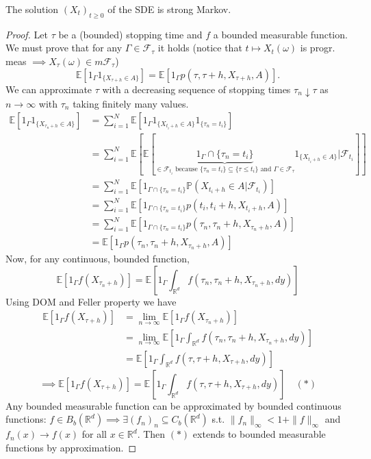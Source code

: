\begin{proposition}
    The solution $(X_t)_{t \ge 0}$ of the SDE is strong Markov.
\end{proposition}

\begin{proof}
    Let $\tau$ be a (bounded) stopping time and $f$ a bounded measurable function. We must prove that for any $\Gamma \in \mathcal{F}_\tau$ it holds (notice that $t \mapsto X_t(\omega)$ is progr. meas $\implies X_\tau(\omega) \in m\mathcal{F}_\tau$)
    $$\mathbb{E}[1_\Gamma 1_{\{X_{\tau+h} \in A\}}] = \mathbb{E}[1_\Gamma p(\tau, \tau+h, X_{\tau+h}, A)].$$
    We can approximate $\tau$ with a decreasing sequence of stopping times $\tau_n \downarrow \tau$ as $n \to \infty$ with $\tau_n$ taking finitely many values.
    \begin{align*}
        \mathbb{E}[1_\Gamma 1_{\{X_{\tau_n+h} \in A\}}] &= \sum_{i=1}^N \mathbb{E}[1_\Gamma 1_{\{X_{t_i+h} \in A\}} 1_{\{\tau_n = t_i\}}] \\
        &= \sum_{i=1}^N \mathbb{E}[\mathbb{E}[\underbrace{1_\Gamma \cap \{\tau_n = t_i\}}_{\in \mathcal{F}_{t_i} \text{ because } \{\tau_n=t_i\} \subseteq \{\tau \le t_i\} \text{ and } \Gamma \in \mathcal{F}_\tau} 1_{\{X_{t_i+h} \in A\}} | \mathcal{F}_{t_i}]] \\
        &= \sum_{i=1}^N \mathbb{E}[1_{\Gamma \cap \{\tau_n = t_i\}} \mathbb{P}(X_{t_i+h} \in A | \mathcal{F}_{t_i})] \\
        &= \sum_{i=1}^N \mathbb{E}[1_{\Gamma \cap \{\tau_n = t_i\}} p(t_i, t_i+h, X_{t_i+h}, A)] \\
        &= \sum_{i=1}^N \mathbb{E}[1_{\Gamma \cap \{\tau_n = t_i\}} p(\tau_n, \tau_n+h, X_{\tau_n+h}, A)] \\
        &= \mathbb{E}[1_\Gamma p(\tau_n, \tau_n+h, X_{\tau_n+h}, A)]
    \end{align*}
    Now, for any continuous, bounded function,
    $$\mathbb{E}[1_\Gamma f(X_{\tau_n+h})] = \mathbb{E}[1_\Gamma \int_{\mathbb{R}^d} f(\tau_n, \tau_n+h, X_{\tau_n+h}, dy)]$$
    Using DOM and Feller property we have
    \begin{align*}
        \mathbb{E}[1_\Gamma f(X_{\tau+h})] &= \lim_{n \to \infty} \mathbb{E}[1_\Gamma f(X_{\tau_n+h})] \\
        &= \lim_{n \to \infty} \mathbb{E}[1_\Gamma \int_{\mathbb{R}^d} f(\tau_n, \tau_n+h, X_{\tau_n+h}, dy)] \\
        &= \mathbb{E}[1_\Gamma \int_{\mathbb{R}^d} f(\tau, \tau+h, X_{\tau+h}, dy)]
    \end{align*}
    $$\implies \mathbb{E}[1_\Gamma f(X_{\tau+h})] = \mathbb{E}[1_\Gamma \int_{\mathbb{R}^d} f(\tau, \tau+h, X_{\tau+h}, dy)] \quad (*)$$
    Any bounded measurable function can be approximated by bounded continuous functions:
    $f \in B_b(\mathbb{R}^d) \implies \exists (f_n)_n \subseteq C_b(\mathbb{R}^d)$ s.t. $\|f_n\|_\infty < 1 + \|f\|_\infty$ and $f_n(x) \to f(x)$ for all $x \in \mathbb{R}^d$. Then $(*)$ extends to bounded measurable functions by approximation.
\end{proof}